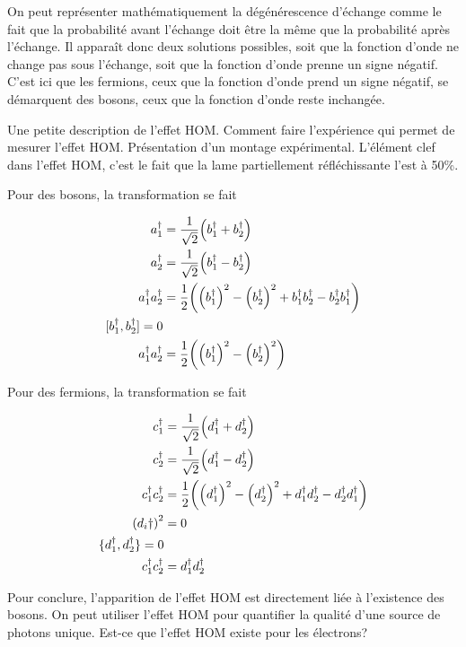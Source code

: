 On peut représenter mathématiquement la dégénérescence d'échange comme le fait
que la probabilité avant l'échange doit être la même que la probabilité après
l'échange. Il apparaît donc deux solutions possibles, soit que la fonction
d'onde ne change pas sous l'échange, soit que la fonction d'onde prenne un signe
négatif. C'est ici que les fermions, ceux que la fonction d'onde prend un signe
négatif, se démarquent des bosons, ceux que la fonction d'onde reste inchangée.


Une petite description de l'effet HOM. Comment faire l'expérience qui permet
de mesurer l'effet HOM.
Présentation d'un montage expérimental\cite{hom1}\cite{hom2}\cite{hom3}.
L'élément clef dans l'effet HOM, c'est le fait que la lame partiellement réfléchissante
l'est à 50\%.

Pour des bosons, la transformation se fait

\begin{align}
    a_1^\dagger&=\frac1{\sqrt{2}}\qty(b_1^\dagger+b_2^\dagger)\\
    a_2^\dagger&=\frac1{\sqrt{2}}\qty(b_1^\dagger-b_2^\dagger)\\
    a_1^\dagger a_2^\dagger&=\frac12\qty(\qty(b_1^\dagger)^2-\qty(b_2^\dagger)^2+b_1^\dagger b_2^\dagger-b_2^\dagger b_1^\dagger)\\
    [b_1^\dagger,b_2^\dagger]=0\\
    a_1^\dagger a_2^\dagger&=\frac12\qty(\qty(b_1^\dagger)^2-\qty(b_2^\dagger)^2)
\end{align}

Pour des fermions, la transformation se fait

\begin{align}
    c_1^\dagger&=\frac1{\sqrt{2}}\qty(d_1^\dagger+d_2^\dagger)\\
    c_2^\dagger&=\frac1{\sqrt{2}}\qty(d_1^\dagger-d_2^\dagger)\\
    c_1^\dagger c_2^\dagger&=\frac12\qty(\qty(d_1^\dagger)^2-\qty(d_2^\dagger)^2+d_1^\dagger d_2^\dagger-d_2^\dagger d_1^\dagger)\\
    \qty(d_i\dagger)^2&=0\\
    \{d_1^\dagger,d_2^\dagger\}=0\\
    c_1^\dagger c_2^\dagger&=d_1^\dagger d_2^\dagger
\end{align}


Pour conclure, l'apparition de l'effet HOM est directement liée à l'existence
des bosons. On peut utiliser l'effet HOM pour quantifier la qualité d'une source
de photons unique. Est-ce que l'effet HOM existe pour les électrons?


\clearpage

